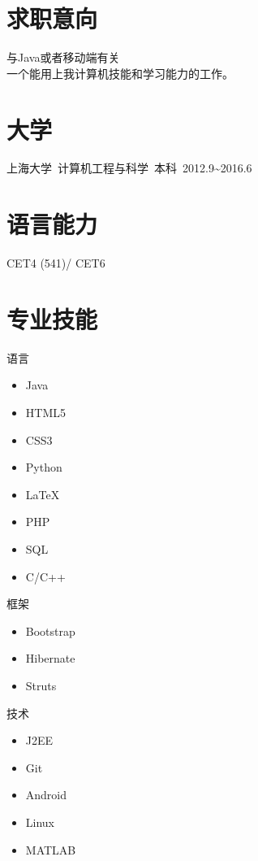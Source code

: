 \documentclass[11pt]{res}
\begin{document}
\address{  beatbox\_gao@hotmail.com\\ GitHub:https://github.com/abcghy}
\address{上海宝山 \\  18818217393}

\begin{resume}

\section{求职意向}
  与Java或者移动端有关\\    
  一个能用上我计算机技能和学习能力的工作。

\section{大学}
  上海大学\ 计算机工程与科学\ 本科\ 2012.9\~{}2016.6

\section{语言能力}
  CET4 (541)/ CET6

\section{专业技能}
  \begin{multicols}{3}
    语言
    \begin{itemize}
      \item Java
      \item HTML5
      \item CSS3
      \item Python
      \item \LaTeX
      \item PHP
      \item SQL
      \item C/C++
    \end{itemize}
    框架
    \begin{itemize}
      \item Bootstrap
      \item Hibernate
      \item Struts
    \end{itemize}
    技术
    \begin{itemize}
      \item J2EE
      \item Git
      \item Android
      \item Linux
      \item MATLAB
    \end{itemize}
  \end{multicols}


\end{resume}
\end{document}
